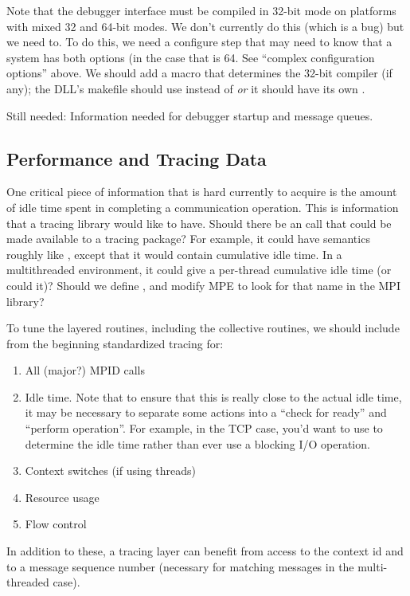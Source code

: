 \documentclass{article}
\begin{document}
Note that the debugger interface must be compiled in 32-bit mode on
platforms with mixed 32 and 64-bit modes.  We don't currently do this
(which is a bug) but we need to.  To do this, we need a configure step
that may need to know that a system has both options (in the case that
 is 64.  See ``complex configuration
options'' above.  We should add a macro  that
determines the 32-bit compiler (if any); the DLL's makefile should use
 instead of  \emph{or} it should have its own
. 

Still needed: Information needed for debugger startup and message
queues.

\subsection{Performance and Tracing Data}
\label{sec:tracing}

One critical piece of information that is hard currently to acquire is
the amount of idle time spent in completing a communication operation.
This is information that a tracing library would like to have.  Should
there be an  call that could be made available to a tracing
package?  For example, it could have semantics roughly like
, except that it would contain cumulative idle time.  In a
multithreaded environment, it could give a per-thread cumulative idle
time (or could it)?  Should we define , and modify MPE
to look for that name in the MPI library?

To tune the layered routines, including the collective routines, we
should include from the beginning standardized tracing for:
\begin{enumerate}
\item All (major?) MPID calls
\item Idle time.  Note that to ensure that this is really close to the
actual idle time, it may be necessary to separate some actions into a
``check for ready'' and ``perform operation''.  For example, in the
TCP case, you'd want to use  to determine the idle time
rather than ever use a blocking I/O operation.  
\item Context switches (if using threads)
\item Resource usage
\item Flow control
\end{enumerate}
In addition to these, a tracing layer can benefit from access to the
context id and to a message sequence number (necessary for matching
messages in the multi-threaded case).  
\end{document}
